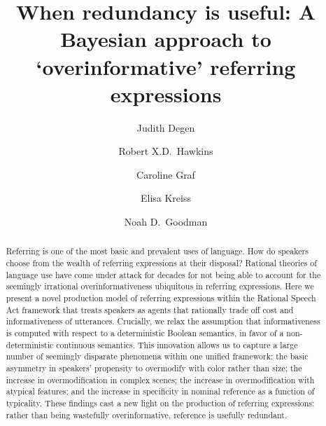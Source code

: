 \documentclass[11pt]{article}
\title{When redundancy is useful: A Bayesian approach to `overinformative' referring expressions}
\author[$\bullet$]{Judith Degen}
\author[$\bullet$]{Robert X.D.~Hawkins}
\author[$\triangleright$]{Caroline Graf}
\author[$\bullet$]{Elisa Kreiss}
\author[$\bullet$]{Noah D.~Goodman}
\affil[$\bullet$]{Stanford University}
\affil[$\triangleright$]{Freie Universit\"at Berlin}
\begin{document}
\maketitle
\thispagestyle{firststyle}

\pagebreak

\pagestyle{mainstyle}
%

\begin{abstract}
Referring is one of the most basic and prevalent uses of language. How do speakers choose from the wealth of referring expressions at their disposal? Rational theories of language use have come under attack for decades for not being able to account for the seemingly irrational overinformativeness ubiquitous in referring expressions. Here we present a novel production model of referring expressions within the Rational Speech Act framework that treats speakers as agents that rationally trade off cost and informativeness of utterances. Crucially, we relax the assumption that informativeness is computed with respect to a deterministic Boolean semantics, in favor of a non-deterministic continuous semantics. This innovation allows us to capture a large number of seemingly disparate phenomena within one unified framework: the basic asymmetry in speakers' propensity to overmodify with color rather than size; the increase in overmodification in complex scenes; the increase in overmodification with atypical features; and the increase in specificity in nominal reference as a function of typicality. These findings cast a new light on the production of referring expressions: rather than being wastefully overinformative, reference is usefully redundant. 
\end{abstract}
\end{document}
